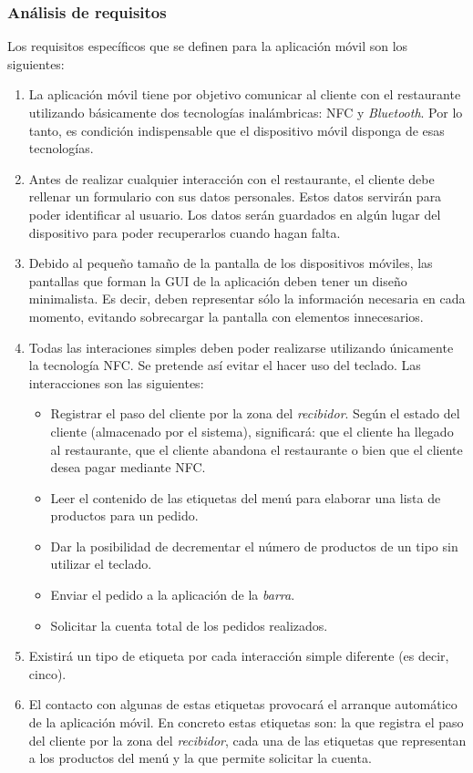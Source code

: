 \subsubsection{Análisis de requisitos}
Los requisitos específicos que se definen para la aplicación móvil son los
siguientes:
\begin{enumerate}
\item La aplicación móvil tiene por objetivo comunicar al cliente con el
restaurante utilizando básicamente dos tecnologías inalámbricas: \acs{NFC} y
\emph{Bluetooth}. Por lo tanto, es condición indispensable que el dispositivo
móvil disponga de esas tecnologías.
\item Antes de realizar cualquier interacción con el restaurante, el cliente
debe rellenar un formulario con sus datos personales. Estos datos servirán para 
poder identificar al usuario. Los datos serán guardados en algún lugar del
dispositivo para poder recuperarlos cuando hagan falta.
\item Debido al pequeño tamaño de la pantalla de los dispositivos móviles, las 
pantallas que forman la \acs{GUI} de la aplicación deben tener un diseño 
minimalista. Es decir, deben representar sólo la información necesaria en cada
momento, evitando sobrecargar la pantalla con elementos innecesarios.
\item Todas las interaciones simples deben poder realizarse utilizando
únicamente la tecnología \acs{NFC}. Se pretende así evitar el hacer uso del
teclado. Las interacciones son las siguientes:
  \begin{itemize}
  \item Registrar el paso del cliente por la zona del \emph{recibidor}.
  Según el estado del cliente (almacenado por el sistema), significará: que
  el cliente ha llegado al restaurante, que el cliente abandona el restaurante
  o bien que el cliente desea pagar mediante \acs{NFC}.
  \item Leer el contenido de las etiquetas del menú para elaborar una lista
  de productos para un pedido.
  \item Dar la posibilidad de decrementar el número de productos de un tipo
  sin utilizar el teclado.
  \item Enviar el pedido a la aplicación de la \emph{barra}.
  \item Solicitar la cuenta total de los pedidos realizados.
  \end{itemize}
\item Existirá un tipo de etiqueta por cada interacción simple diferente
(es decir, cinco).
\item El contacto con algunas de estas etiquetas provocará el arranque
automático de la aplicación móvil. En concreto estas etiquetas son: la que
registra el paso del cliente por la zona del \emph{recibidor}, cada una de las
etiquetas que representan a los productos del menú y la que permite solicitar
la cuenta.
\end{enumerate}

